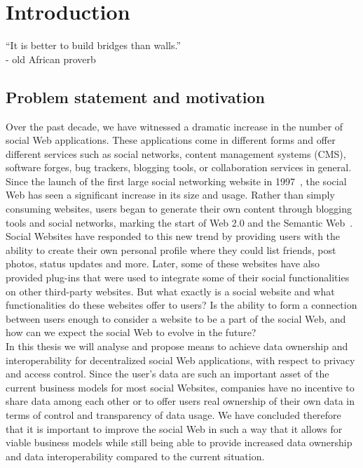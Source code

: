 \chapter{Introduction}
\label{ch:intro}
\setcounter{page}{1}

``It is better to build bridges than walls.''\\
- old African proverb

\section{Problem statement and motivation}
\label{sec:statement}
Over the past decade, we have witnessed a dramatic increase in the number of social Web applications. These applications come in different forms and offer different services such as social networks, content management systems (CMS), software forges, bug trackers, blogging tools, or collaboration services in general.\\

Since the launch of the first large social networking website in 1997~\cite{ellison2007social}, the social Web has seen a significant increase in its size and usage. Rather than simply consuming websites, users began to generate their own content through blogging tools and social networks, marking the start of Web 2.0 and the Semantic Web~\cite{berners1999weaving}. Social Websites have responded to this new trend by providing users with the ability to create their own personal profile where they could list friends, post photos, status updates and more. Later, some of these websites have also provided plug-ins that were used to integrate some of their social functionalities on other third-party websites. But what exactly is a social website and what functionalities do these websites offer to users? Is the ability to form a connection between users enough to consider a website to be a part of the social Web, and how can we expect the social Web to evolve in the future?\\

In this thesis we will analyse and propose means to achieve data ownership and interoperability for decentralized social Web applications, with respect to privacy and access control. Since the user's data are such an important asset of the current business models for most social Websites, companies have no incentive to share data among each other or to offer users real ownership of their own data in terms of control and transparency of data usage. We have concluded therefore that it is important to improve the social Web in such a way that it allows for viable business models while still being able to provide increased data ownership and data interoperability compared to the current situation.\\


